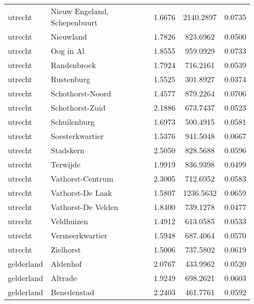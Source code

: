 \begin{longtable}{llccc}
	utrecht       & Nieuw Engeland, Schepenbuurt     & 1.6676  & 2140.2897 & 0.0735          \\
	utrecht       & Nieuwland                        & 1.7826  & 823.6962  & 0.0500          \\
	utrecht       & Oog in Al                        & 1.8555  & 959.0929  & 0.0733          \\
	utrecht       & Randenbroek                      & 1.7924  & 716.2161  & 0.0539          \\
	utrecht       & Rustenburg                       & 1.5525  & 301.8927  & 0.0374          \\
	utrecht       & Schothorst-Noord                 & 1.4577  & 879.2264  & 0.0706          \\
	utrecht       & Schothorst-Zuid                  & 2.1886  & 673.7437  & 0.0523          \\
	utrecht       & Schuilenburg                     & 1.6973  & 500.4915  & 0.0581          \\
	utrecht       & Soesterkwartier                  & 1.5376  & 941.5048  & 0.0667          \\
	utrecht       & Stadskern                        & 2.5050  & 828.5688  & 0.0596          \\
	utrecht       & Terwijde                         & 1.9919  & 836.9398  & 0.0499          \\
	utrecht       & Vathorst-Centrum                 & 2.3005  & 712.6952  & 0.0583          \\
	utrecht       & Vathorst-De Laak                 & 1.5807  & 1236.5632 & 0.0659          \\
	utrecht       & Vathorst-De Velden               & 1.8400  & 739.1278  & 0.0477          \\
	utrecht       & Veldhuizen                       & 1.4912  & 613.0585  & 0.0533          \\
	utrecht       & Vermeerkwartier                  & 1.5948  & 687.4064  & 0.0570          \\
	utrecht       & Zielhorst                        & 1.5006  & 737.5802  & 0.0619          \\
	gelderland    & Aldenhof                         & 2.0767  & 433.9962  & 0.0520          \\
	gelderland    & Altrade                          & 1.9249  & 698.2621  & 0.0603          \\
	gelderland    & Benedenstad                      & 2.2403  & 461.7761  & 0.0592          \\

\end{longtable}
